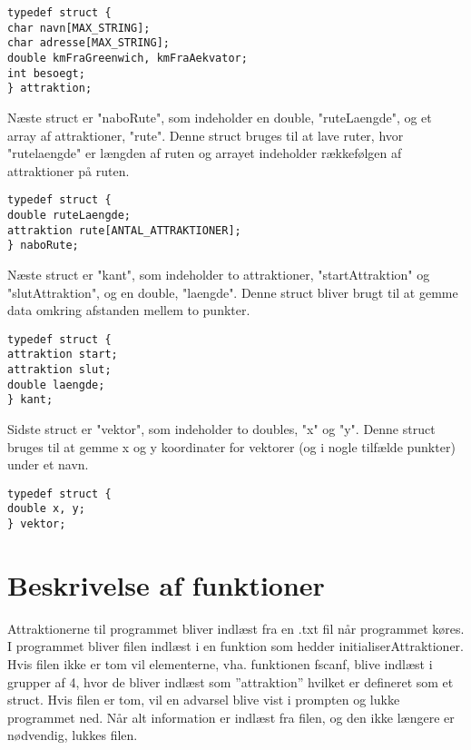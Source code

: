 \begin{lstlisting}
typedef struct {
char navn[MAX_STRING];
char adresse[MAX_STRING]; 
double kmFraGreenwich, kmFraAekvator;
int besoegt;
} attraktion;
\end{lstlisting} 

Næste struct er "naboRute", som indeholder en double, "ruteLaengde", og et array af attraktioner, "rute". Denne struct bruges til at lave ruter, hvor "rutelaengde" er længden af ruten og arrayet indeholder rækkefølgen af attraktioner på ruten. \newline

\begin{lstlisting}
typedef struct {
double ruteLaengde;
attraktion rute[ANTAL_ATTRAKTIONER];
} naboRute;
\end{lstlisting}

Næste struct er "kant", som indeholder to attraktioner, "startAttraktion" og "slutAttraktion", og en double, "laengde". Denne struct bliver brugt til at gemme data omkring afstanden mellem to punkter.\newline

\begin{lstlisting}
typedef struct {
attraktion start;
attraktion slut;
double laengde;
} kant;
\end{lstlisting}

Sidste struct er "vektor", som indeholder to doubles, "x" og "y". Denne struct bruges til at gemme x og y koordinater for vektorer (og i nogle tilfælde punkter) under et navn. \newline

\begin{lstlisting}
typedef struct {
double x, y;
} vektor;
\end{lstlisting}

\section{Beskrivelse af funktioner}
Attraktionerne til programmet bliver indlæst fra en .txt fil når programmet køres. I programmet bliver filen indlæst i en funktion som hedder initialiserAttraktioner. Hvis filen ikke er tom vil elementerne, vha. funktionen fscanf, blive indlæst i grupper af 4, hvor de bliver indlæst som ”attraktion” hvilket er defineret som et struct. Hvis filen er tom, vil en advarsel blive vist i prompten og lukke programmet ned. Når alt information er indlæst fra filen, og den ikke længere er nødvendig, lukkes filen.\newline

